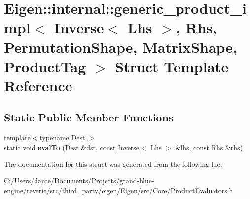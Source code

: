 \hypertarget{struct_eigen_1_1internal_1_1generic__product__impl_3_01_inverse_3_01_lhs_01_4_00_01_rhs_00_01_pec7dcfbcd610060a544651ed47d5cce0c}{}\section{Eigen\+::internal\+::generic\+\_\+product\+\_\+impl$<$ Inverse$<$ Lhs $>$, Rhs, Permutation\+Shape, Matrix\+Shape, Product\+Tag $>$ Struct Template Reference}
\label{struct_eigen_1_1internal_1_1generic__product__impl_3_01_inverse_3_01_lhs_01_4_00_01_rhs_00_01_pec7dcfbcd610060a544651ed47d5cce0c}
\subsection*{Static Public Member Functions}
\begin{DoxyCompactItemize}
\item 
\mbox{\label{struct_eigen_1_1internal_1_1generic__product__impl_3_01_inverse_3_01_lhs_01_4_00_01_rhs_00_01_pec7dcfbcd610060a544651ed47d5cce0c_a57d6e298e8720d837bedeeb25780b7a7}} 
{\footnotesize template$<$typename Dest $>$ }\\static void {\bfseries eval\+To} (Dest \&dst, const \mbox{\hyperlink{class_eigen_1_1_inverse}{Inverse}}$<$ Lhs $>$ \&lhs, const Rhs \&rhs)
\end{DoxyCompactItemize}


The documentation for this struct was generated from the following file\+:\begin{DoxyCompactItemize}
\item 
C\+:/\+Users/dante/\+Documents/\+Projects/grand-\/blue-\/engine/reverie/src/third\+\_\+party/eigen/\+Eigen/src/\+Core/Product\+Evaluators.\+h\end{DoxyCompactItemize}

